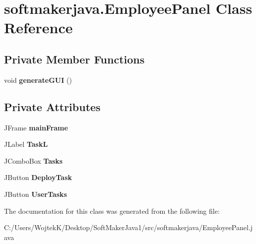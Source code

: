 \hypertarget{classsoftmakerjava_1_1_employee_panel}{}\section{softmakerjava.\+Employee\+Panel Class Reference}
\label{classsoftmakerjava_1_1_employee_panel}
\subsection*{Private Member Functions}
\begin{DoxyCompactItemize}
\item 
void {\bfseries generate\+G\+UI} ()\hypertarget{classsoftmakerjava_1_1_employee_panel_a65a82e401bef7e5fefbe1e3d514583f9}{}\label{classsoftmakerjava_1_1_employee_panel_a65a82e401bef7e5fefbe1e3d514583f9}

\end{DoxyCompactItemize}
\subsection*{Private Attributes}
\begin{DoxyCompactItemize}
\item 
J\+Frame {\bfseries main\+Frame}\hypertarget{classsoftmakerjava_1_1_employee_panel_a2485a0dd32b74a75903f3abb4d6b2947}{}\label{classsoftmakerjava_1_1_employee_panel_a2485a0dd32b74a75903f3abb4d6b2947}

\item 
J\+Label {\bfseries TaskL}\hypertarget{classsoftmakerjava_1_1_employee_panel_a2c0695a415bb394696e30f8845e0560e}{}\label{classsoftmakerjava_1_1_employee_panel_a2c0695a415bb394696e30f8845e0560e}

\item 
J\+Combo\+Box {\bfseries Tasks}\hypertarget{classsoftmakerjava_1_1_employee_panel_a3439b96e80f6d72bc6df0df0da25dece}{}\label{classsoftmakerjava_1_1_employee_panel_a3439b96e80f6d72bc6df0df0da25dece}

\item 
J\+Button {\bfseries Deploy\+Task}\hypertarget{classsoftmakerjava_1_1_employee_panel_ac56fb2347a9d62e8a3c6b90cdf648ad5}{}\label{classsoftmakerjava_1_1_employee_panel_ac56fb2347a9d62e8a3c6b90cdf648ad5}

\item 
J\+Button {\bfseries User\+Tasks}\hypertarget{classsoftmakerjava_1_1_employee_panel_a6a84141fc2fc2c3806d180394c9d95ed}{}\label{classsoftmakerjava_1_1_employee_panel_a6a84141fc2fc2c3806d180394c9d95ed}

\end{DoxyCompactItemize}


The documentation for this class was generated from the following file\+:\begin{DoxyCompactItemize}
\item 
C\+:/\+Users/\+Wojtek\+K/\+Desktop/\+Soft\+Maker\+Java1/src/softmakerjava/Employee\+Panel.\+java\end{DoxyCompactItemize}
